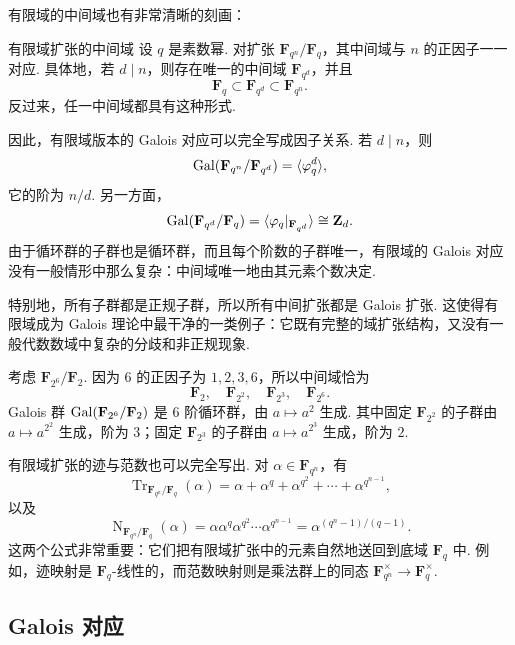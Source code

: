 有限域的中间域也有非常清晰的刻画：

\begin{theorem}{有限域扩张的中间域}{}
    设 $q$ 是素数幂. 对扩张 $\mathbf{F}_{q^n}/\mathbf{F}_q$，其中间域与 $n$ 的正因子一一对应. 具体地，若 $d\mid n$，则存在唯一的中间域 $\mathbf{F}_{q^d}$，并且
    \[
        \mathbf{F}_q\subset \mathbf{F}_{q^d}\subset \mathbf{F}_{q^n}.
    \]
    反过来，任一中间域都具有这种形式.
\end{theorem}

因此，有限域版本的 Galois 对应可以完全写成因子关系. 若 $d\mid n$，则
\[
    \operatorname{Gal}(\mathbf{F}_{q^n}/\mathbf{F}_{q^d})
    =
    \langle\varphi_q^d\rangle,
\]
它的阶为 $n/d$. 另一方面，
\[
    \operatorname{Gal}(\mathbf{F}_{q^d}/\mathbf{F}_q)
    =
    \langle\varphi_q|_{\mathbf{F}_{q^d}}\rangle
    \cong\mathbf{Z}_d.
\]
由于循环群的子群也是循环群，而且每个阶数的子群唯一，有限域的 Galois 对应没有一般情形中那么复杂：中间域唯一地由其元素个数决定.

特别地，所有子群都是正规子群，所以所有中间扩张都是 Galois 扩张. 这使得有限域成为 Galois 理论中最干净的一类例子：它既有完整的域扩张结构，又没有一般代数数域中复杂的分歧和非正规现象.

\begin{example}{}{}
    考虑 $\mathbf{F}_{2^6}/\mathbf{F}_2$. 因为 $6$ 的正因子为 $1,2,3,6$，所以中间域恰为
    \[
        \mathbf{F}_2,\quad \mathbf{F}_{2^2},\quad \mathbf{F}_{2^3},\quad \mathbf{F}_{2^6}.
    \]
    Galois 群 $\operatorname{Gal}(\mathbf{F}_{2^6}/\mathbf{F}_2)$ 是 $6$ 阶循环群，由 $a\mapsto a^2$ 生成. 其中固定 $\mathbf{F}_{2^2}$ 的子群由 $a\mapsto a^{2^2}$ 生成，阶为 $3$；固定 $\mathbf{F}_{2^3}$ 的子群由 $a\mapsto a^{2^3}$ 生成，阶为 $2$.
\end{example}

有限域扩张的迹与范数也可以完全写出. 对 $\alpha\in\mathbf{F}_{q^n}$，有
\[
    \operatorname{Tr}_{\mathbf{F}_{q^n}/\mathbf{F}_q}(\alpha)
    =
    \alpha+\alpha^q+\alpha^{q^2}+\cdots+\alpha^{q^{n-1}},
\]
以及
\[
    \operatorname{N}_{\mathbf{F}_{q^n}/\mathbf{F}_q}(\alpha)
    =
    \alpha\alpha^q\alpha^{q^2}\cdots\alpha^{q^{n-1}}
    =
    \alpha^{(q^n-1)/(q-1)}.
\]
这两个公式非常重要：它们把有限域扩张中的元素自然地送回到底域 $\mathbf{F}_q$ 中. 例如，迹映射是 $\mathbf{F}_q$-线性的，而范数映射则是乘法群上的同态 $\mathbf{F}_{q^n}^{\times}\to\mathbf{F}_q^{\times}$.

\subsection{Galois 对应}

